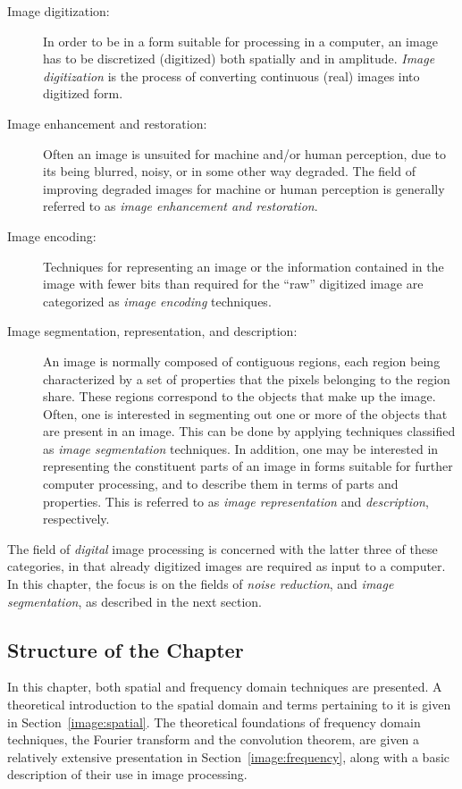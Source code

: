 \begin{description}
\item[Image digitization:] In order to be in a form suitable for
  processing in a computer, an image has to be discretized (digitized)
  both spatially and in amplitude.  {\em Image digitization\/} is the
  process of converting continuous (real) images into digitized form.
\item[Image enhancement and restoration:] Often an image is unsuited
  for machine and/or human perception, due to its being blurred,
  noisy, or in some other way degraded.  The field of improving
  degraded images for machine or human perception is generally
  referred to as {\em image enhancement and restoration\/}.
\item[Image encoding:] Techniques for representing an image or the
  information contained in the image with fewer bits than required
  for the ``raw'' digitized image are categorized as {\em image
    encoding\/} techniques.
\item[Image segmentation, representation, and description:] An image
  is normally composed of contiguous regions, each region being
  characterized by a set of properties that the pixels belonging to
  the region share.  These regions correspond to the objects that make
  up the image.  Often, one is interested in segmenting out one or
  more of the objects that are present in an image.  This can be done
  by applying techniques classified as {\em image segmentation\/}
  techniques.  In addition, one may be interested in representing the
  constituent parts of an image in forms suitable for further computer
  processing, and to describe them in terms of parts and properties.
  This is referred to as {\em image representation\/} and {\em
    description\/}, respectively.
\end{description}

The field of {\em digital\/} image processing is concerned with the
latter three of these categories, in that already digitized images are
required as input to a computer.  In this chapter, the focus is on the
fields of {\em noise reduction\/}, and {\em image segmentation\/}, as
described in the next section.

\subsection{Structure of the Chapter}
\label{image:intro:structure}

In this chapter, both spatial and frequency domain techniques are
presented.  A theoretical introduction to the spatial domain and terms
pertaining to it is given in Section~\ref{image:spatial}.  The
theoretical foundations of frequency domain techniques, the Fourier
transform and the convolution theorem, are given a relatively
extensive presentation in Section~\ref{image:frequency}, along with a
basic description of their use in image processing.

